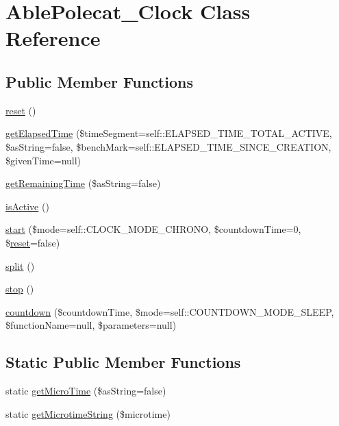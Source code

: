 \hypertarget{class_able_polecat___clock}{}\section{Able\+Polecat\+\_\+\+Clock Class Reference}
\label{class_able_polecat___clock}
\subsection*{Public Member Functions}
\begin{DoxyCompactItemize}
\item 
\hyperlink{class_able_polecat___clock_a4a20559544fdf4dcb457e258dc976cf8}{reset} ()
\item 
\hyperlink{class_able_polecat___clock_a7f4f85e0b6d6280aa31b9ef55f5ff2c5}{get\+Elapsed\+Time} (\$time\+Segment=self\+::\+E\+L\+A\+P\+S\+E\+D\+\_\+\+T\+I\+M\+E\+\_\+\+T\+O\+T\+A\+L\+\_\+\+A\+C\+T\+I\+V\+E, \$as\+String=false, \$bench\+Mark=self\+::\+E\+L\+A\+P\+S\+E\+D\+\_\+\+T\+I\+M\+E\+\_\+\+S\+I\+N\+C\+E\+\_\+\+C\+R\+E\+A\+T\+I\+O\+N, \$given\+Time=null)
\item 
\hyperlink{class_able_polecat___clock_a941f1c4e39fe6a576ec8a5fe0b6e00dd}{get\+Remaining\+Time} (\$as\+String=false)
\item 
\hyperlink{class_able_polecat___clock_aa56a17bc66c1081fad1cca3a488224c3}{is\+Active} ()
\item 
\hyperlink{class_able_polecat___clock_a858036aeb7d29d5d0e314454045b1684}{start} (\$mode=self\+::\+C\+L\+O\+C\+K\+\_\+\+M\+O\+D\+E\+\_\+\+C\+H\+R\+O\+N\+O, \$countdown\+Time=0, \$\hyperlink{class_able_polecat___clock_a4a20559544fdf4dcb457e258dc976cf8}{reset}=false)
\item 
\hyperlink{class_able_polecat___clock_a6c0c41e7a45a3c1899074b89c235114c}{split} ()
\item 
\hyperlink{class_able_polecat___clock_a8b6fc76a620d7557d06e9a11a9ffb509}{stop} ()
\item 
\hyperlink{class_able_polecat___clock_a40b2ead9e71a4258814b01d3f9d9298b}{countdown} (\$countdown\+Time, \$mode=self\+::\+C\+O\+U\+N\+T\+D\+O\+W\+N\+\_\+\+M\+O\+D\+E\+\_\+\+S\+L\+E\+E\+P, \$function\+Name=null, \$parameters=null)
\end{DoxyCompactItemize}
\subsection*{Static Public Member Functions}
\begin{DoxyCompactItemize}
\item 
static \hyperlink{class_able_polecat___clock_a61e1e95fb26ff54d8ef966e5bce183dd}{get\+Micro\+Time} (\$as\+String=false)
\item 
static \hyperlink{class_able_polecat___clock_a610771125599af0a8822c5618eeced9b}{get\+Microtime\+String} (\$microtime)
\end{DoxyCompactItemize}
